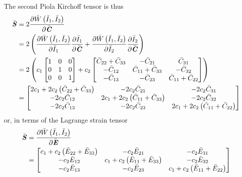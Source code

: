 The second Piola Kirchoff tensor is thus
\begin{equation}
  \begin{split}
    \bar{\boldsymbol{\mathit{S}}}&=2 \dfrac{\partial  \bar{W}\left( \bar{I}_{1},\bar{I}_{2} \right) }{\partial \bar{\boldsymbol{\mathit{C}}}} \\
    &=2\left(  \dfrac{\partial  \bar{W}\left( \bar{I}_{1},\bar{I}_{2} \right) }{\partial \bar{I}_{1}}  \dfrac{\partial \bar{I}_{1}}{\partial \bar{\boldsymbol{\mathit{C}}}} + \dfrac{\partial  \bar{W}\left( \bar{I}_{1},\bar{I}_{2} \right) }{\partial \bar{I}_{2}}  \dfrac{\partial \bar{I}_{2}}{\partial \bar{\boldsymbol{\mathit{C}}}}  \right)\\
    &=2\left( c_{1}\begin{bmatrix}
        1 & 0 & 0 \\
        0 & 1 & 0 \\
        0 & 0 & 1
      \end{bmatrix}+c_{2}\begin{bmatrix}
        \bar{C}_{22}+\bar{C}_{33} & -\bar{C}_{21} & \bar{C}_{31} \\
        -\bar{C}_{12} & \bar{C}_{11}+\bar{C}_{33} & -\bar{C}_{32} \\
        -\bar{C}_{13} & -\bar{C}_{23} & \bar{C}_{11}+\bar{C}_{22}
    \end{bmatrix} \right) \\
    &=\begin{bmatrix}
    2c_{1}+2c_{2}\left( \bar{C}_{22}+\bar{C}_{33} \right) & -2c_{2}\bar{C}_{21} &
    -2c_{2}\bar{C}_{31} \\
    -2c_{2}\bar{C}_{12} & 2c_{1}+2c_{2}\left( \bar{C}_{11}+\bar{C}_{33} \right) & -2c_{2}\bar{C}_{32} \\
    -2c_{2}\bar{C}_{13} & -2c_{2}\bar{C}_{23} & 2c_{1}+2c_{2}\left( \bar{C}_{11}+\bar{C}_{22} \right) 
    \end{bmatrix}
  \end{split}
\end{equation}
or, in terms of the Lagrange strain tensor
\begin{equation}
  \begin{split}
    \bar{\boldsymbol{\mathit{S}}}&= \dfrac{\partial  \bar{W}\left( \bar{I}_{1},\bar{I}_{2} \right) }{\partial \bar{\boldsymbol{\mathit{E}}}} \\
    &=\begin{bmatrix}
    c_{1}+c_{2}\left( \bar{E}_{22}+\bar{E}_{33} \right) & -c_{2}\bar{E}_{21} & -c_{2}\bar{E}_{31} \\
    -c_{2}\bar{E}_{12} & c_{1}+c_{2}\left( \bar{E}_{11}+\bar{E}_{33} \right) & -c_{2}\bar{E}_{32} \\
    -c_{2}\bar{E}_{13} & -c_{2}\bar{E}_{23} & c_{1}+c_{2}\left( \bar{E}_{11}+\bar{E}_{22} \right)
    \end{bmatrix}
  \end{split}
\end{equation}

